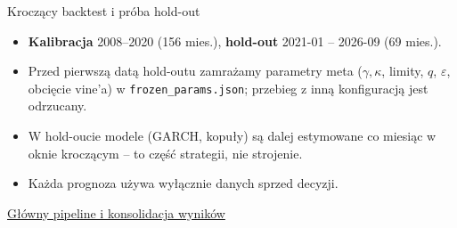\documentclass[aspectratio=169,11pt]{beamer}
\newcommand{\repo}{https://github.com/michalmarchwiak/bsc-project}
\newcommand{\rev}{9e941db56fde866672b262f5f6725268ce58feb7}
\newcommand{\src}[2]{\vfill{\scriptsize\color{Teal}%
  \href{\repo/blob/\rev/#1}{#2}}}
\begin{document}
\begin{frame}{Kroczący backtest i próba hold-out}
  \centering
  \raggedright\medskip
  \begin{itemize}
    \item \textbf{Kalibracja} 2008--2020 (156 mies.), \textbf{hold-out}
      2021-01 -- 2026-09 (69 mies.).
    \item Przed pierwszą datą hold-outu zamrażamy parametry meta
      (\(\gamma,\kappa\), limity, \(q\), \(\varepsilon\), obcięcie vine'a)
      w \texttt{frozen\_params.json}; przebieg z inną konfiguracją
      jest odrzucany.
    \item W hold-oucie modele (GARCH, kopuły) są dalej estymowane co
      miesiąc w oknie kroczącym -- to część strategii, nie strojenie.
    \item Każda prognoza używa wyłącznie danych sprzed decyzji.
  \end{itemize}
  \src{pipelines/backtest.py}{Główny pipeline i konsolidacja wyników}
\end{frame}
\end{document}
